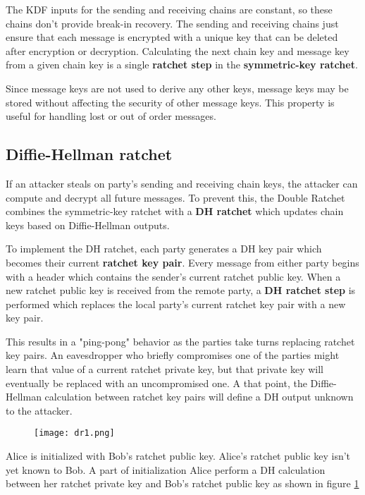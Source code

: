 The KDF inputs for the sending and receiving chains are constant, so these chains don't provide break-in recovery. The sending and receiving chains just ensure that each message is encrypted with a unique key that can be deleted after encryption or decryption. Calculating the next chain key and message key from a given chain key is a single \textbf{ratchet step} in the \textbf{symmetric-key ratchet}.

Since message keys are not used to derive any other keys, message keys may be stored without affecting the security of other message keys. This property is useful for handling lost or out of order messages.

\subsection{Diffie-Hellman ratchet}
\label{subsec:Diffie-HellmanRatchet}

If an attacker steals on party's sending and receiving chain keys, the attacker can compute and decrypt all future messages. To prevent this, the Double Ratchet combines the symmetric-key ratchet with a \textbf{DH ratchet} which updates chain keys based on Diffie-Hellman outputs.

To implement the DH ratchet, each party generates a DH key pair which becomes their current \textbf{ratchet key pair}. Every message from either party begins with a header which contains the sender's current ratchet public key. When a new ratchet public key is received from the remote party, a \textbf{DH ratchet step} is performed which replaces the local party's current ratchet key pair with a new key pair.

This results in a "ping-pong" behavior as the parties take turns replacing ratchet key pairs. An eavesdropper who briefly compromises one of the parties might learn that value of a current ratchet private key, but that private key will eventually be replaced with an uncompromised one. A that point, the Diffie-Hellman calculation between ratchet key pairs will define a DH output unknown to the attacker.

\newpage

\begin{figure}[ht!]
  \centering
  \texttt{[image: dr1.png]}
  \caption{}
  \label{fig:dr1}
\end{figure}

Alice is initialized with Bob's ratchet public key. Alice's ratchet public key isn't yet known to Bob. A part of initialization Alice perform a DH calculation between her ratchet private key and Bob's ratchet public key as shown in figure \ref{fig:dr1}


